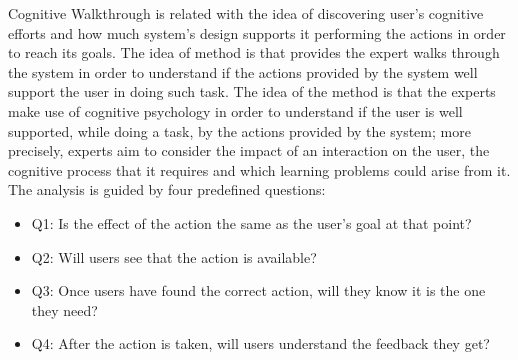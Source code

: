 \documentclass[12pt, a4paper]{article}
\numberwithin{figure}{section}
\begin{document}
Cognitive Walkthrough is related with the idea of discovering user's cognitive efforts and how much
system's design supports it performing the actions in order to reach its goals.
The idea of method is that provides the expert walks through the system in order to understand if the actions
provided by the system well support the user in doing such task.
The idea of the method is that the experts make use of cognitive psychology in order to understand if the user is well supported, while doing a task,
by the actions provided by the system; more precisely, experts aim to consider the impact of an interaction on the user,
the cognitive process that it requires and which learning problems could arise from it.
The analysis is guided by four predefined questions:
\begin{itemize}
	\item Q1: Is the effect of the action the same as the user’s goal at that point?
	\item Q2: Will users see that the action is available?
	\item Q3: Once users have found the correct action, will they know it is the one they need?
	\item Q4: After the action is taken, will users understand the feedback they get?
\end{itemize}
\end{document}
